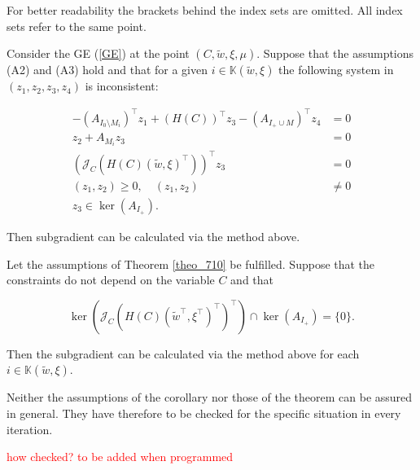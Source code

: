 For better readability the brackets behind the index sets are omitted. All index sets refer to the same point.

\begin{theorem}
	\label{theo_710}
	Consider the GE (\ref{GE}) at the point \((C,\tilde{w},\xi,\mu)\). Suppose that the assumptions (A2) and (A3) hold and that for a given \(i\in \mathbb{K}(\tilde{w},\xi)\) the following system in \((z_1,z_2,z_3,z_4)\) is inconsistent:
	
	\begin{align*}
		-(A_{I_0 \setminus M_i})^{\top}z_1+(H(C))^{\top}z_3-(A_{I_+\cup M})^{\top}z_4 &= 0 \\
		z_2+A_{M_i}z_3 &= 0\\
		\left(\mathcal{J}_C\left(H(C)(\tilde{w},\xi)^{\top}\right)\right)^{\top}z_3 &= 0 \\	
		(z_1,z_2) \geq 0, \quad (z_1,z_2) &\neq 0 \\
		z_3 \in \ker(A_{I_+}).
	\end{align*}
	
	Then subgradient can be calculated via the method above.
\end{theorem}

\begin{corollary}
	Let the assumptions of Theorem \ref{theo_710} be fulfilled. Suppose that the constraints do not depend on the variable \(C\) and that 
	
	\[  \ker\left(\mathcal{J}_C\left(H(C)(\tilde{w}^{\top},\xi^{\top})^{\top}\right)^{\top}\right) \cap \ker\left(A_{I_+}\right) = \{0\} .\]
	
	Then the subgradient can be calculated via the method above for each \(i \in \mathbb{K}(\tilde{w},\xi)\).
\end{corollary}

Neither the assumptions of the corollary nor those of the theorem can be assured in general. They have therefore to be checked for the specific situation in every iteration.

\textcolor{red}{how checked? to be added when programmed}









